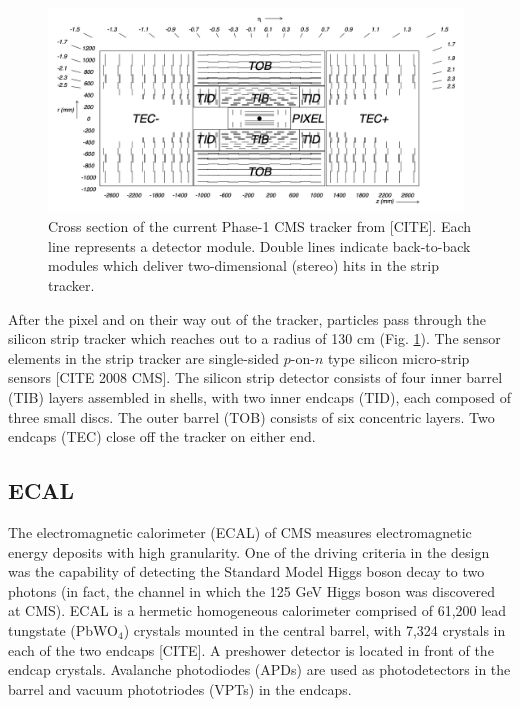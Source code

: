 \begin{figure}[ht]
    \centering
    \includegraphics[width=11cm]{figures/ch-2-cern-cms/phase-1-tdr-tracker-schematic.png}
    \caption{Cross section of the current Phase-1 CMS tracker from [CITE]. Each line represents a detector module. Double lines indicate back-to-back modules which deliver two-dimensional (stereo) hits in the strip tracker.}
    \label{fig:phase-1-tdr-tracker-schematic}
\end{figure}



After the pixel and on their way out of the tracker, particles pass through the silicon strip tracker which reaches out to a radius of 130 cm (Fig. \ref{fig:phase-1-tdr-tracker-schematic}). The sensor elements in the strip tracker are single-sided $p$-on-$n$ type silicon micro-strip sensors [CITE 2008 CMS]. The silicon strip detector consists of four inner barrel (TIB) layers assembled in shells, with two inner endcaps (TID), each composed of three small discs. The outer barrel (TOB) consists of six concentric layers. Two endcaps (TEC) close off the tracker on either end. 


\subsection{ECAL} 
The electromagnetic calorimeter (ECAL) of CMS measures electromagnetic energy deposits with high granularity. One of the driving criteria in the design was the capability of detecting the Standard Model Higgs boson decay to two photons (in fact, the channel in which the 125 GeV Higgs boson was discovered at CMS). %
ECAL is a hermetic homogeneous calorimeter comprised of 61,200 lead tungstate (PbWO$_4$) crystals mounted in the central barrel, with 7,324 crystals in each of the two endcaps [CITE]. A preshower detector is located in front of the endcap crystals. Avalanche photodiodes (APDs) are used as photodetectors in the barrel and vacuum phototriodes (VPTs) in the endcaps. 

